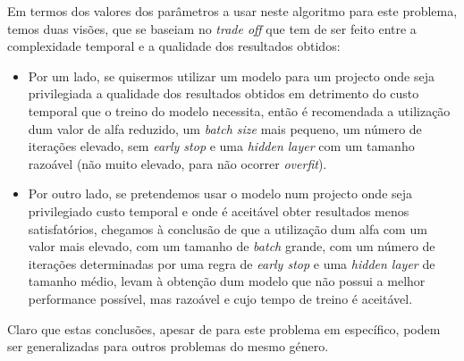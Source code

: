 Em termos dos valores dos parâmetros a usar neste algoritmo para este problema, temos duas visões, que se baseiam no \textit{trade off} que tem de ser feito entre a complexidade temporal e a qualidade dos resultados obtidos:
\begin{itemize}
\item Por um lado, se quisermos utilizar um modelo para um projecto onde seja privilegiada a qualidade dos resultados obtidos em detrimento do custo temporal que o treino do modelo necessita, então é recomendada a utilização dum valor de alfa reduzido, um \textit{batch size} mais pequeno, um número de iterações elevado, sem \textit{early stop} e uma \textit{hidden layer} com um tamanho razoável (não muito elevado, para não ocorrer \textit{overfit}).
\item Por outro lado, se pretendemos usar o modelo num projecto onde seja privilegiado custo temporal e onde é aceitável obter resultados menos satisfatórios, chegamos à conclusão de que a utilização dum alfa com um valor mais elevado, com um tamanho de \textit{batch} grande, com um número de iterações determinadas por uma regra de \textit{early stop} e uma \textit{hidden layer} de tamanho médio, levam à obtenção dum modelo que não possui a melhor performance possível, mas razoável e cujo tempo de treino é aceitável.
\end{itemize}
Claro que estas conclusões, apesar de para este problema em específico, podem ser generalizadas para outros problemas do mesmo género.
